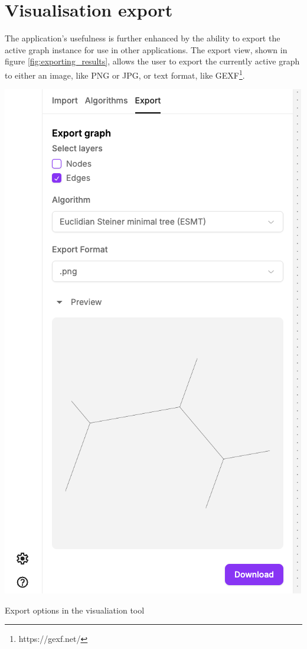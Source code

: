 \documentclass{l4proj}
\begin{document}
\section{Visualisation export}
\label{sec:exporting_results}
The application's usefulness is further enhanced by the ability to export the active graph instance for use in other applications. The export view, shown in figure \ref{fig:exporting_results}, allows the user to export the currently active graph to either an image, like PNG or JPG, or text format, like GEXF\footnote{https://gexf.net/}.
\begin{wrapstuff}[r,width=0.4\textwidth,type=figure]
    \centering
    \begin{tcolorbox}[colframe=gray!20, colback=gray!5, boxrule=1pt, arc=0mm, boxsep=0pt, left=0pt, right=0pt, top=0pt, bottom=0pt]
        \includegraphics[width=\textwidth]{images/export_view.png}
    \end{tcolorbox}
    \caption{Export options in the visualiation tool}
    \label{fig:exporting_results}
\end{wrapstuff}
\end{document}

